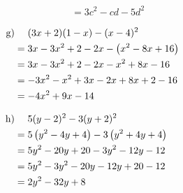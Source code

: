 \begin{exercise}
{\begin{equation*}
\begin{split}
          &=3c^2-cd-5d^2
        \end{split}
      \end{equation*}
    }%
    \newcommand{\solutionG}
    {%
      \begin{equation*}
        \begin{split}
          \toprow{\text{g)}}{(3x+2)(1-x)-(x-4)^2} \\
          &=3x-3x^2+2-2x-\left(x^2-8x+16\right)   \\
          &=3x-3x^2+2-2x-x^2+8x-16                \\
          &=-3x^2-x^2+3x-2x+8x+2-16               \\
          &=-4x^2+9x-14
        \end{split}
      \end{equation*}
    }%
    \newcommand{\solutionH}
    {%
      \begin{equation*}
        \begin{split}
          \toprow{\text{h)}}{5(y-2)^2-3(y+2)^2}           \\
          &=5\left(y^2-4y+4\right)-3\left(y^2+4y+4\right) \\
          &=5y^2-20y+20-3y^2-12y-12                       \\
          &=5y^2-3y^2-20y-12y+20-12                       \\
          &=2y^2-32y+8
        \end{split}
      \end{equation*}
    }%

    \begin{minipage}[t]{0.49\textwidth}
      \small
      \solutionA
    \end{minipage}%
    \hfill
    \begin{minipage}[t]{0.49\textwidth}
      \small
      \solutionB
    \end{minipage}%

    \begin{minipage}[t]{0.49\textwidth}
      \small
      \solutionC
    \end{minipage}%
    \hfill
    \begin{minipage}[t]{0.49\textwidth}
      \small
      \solutionD
    \end{minipage}%

    \begin{minipage}[t]{0.49\textwidth}
      \small
      \solutionE
    \end{minipage}%
    \hfill
    \begin{minipage}[t]{0.49\textwidth}
      \small
      \solutionF
    \end{minipage}%

    \begin{minipage}[t]{0.49\textwidth}
      \small
      \solutionG
    \end{minipage}%
    \hfill
    \begin{minipage}[t]{0.49\textwidth}
      \small
      \solutionH
    \end{minipage}%

  \fi
\end{exercise}
